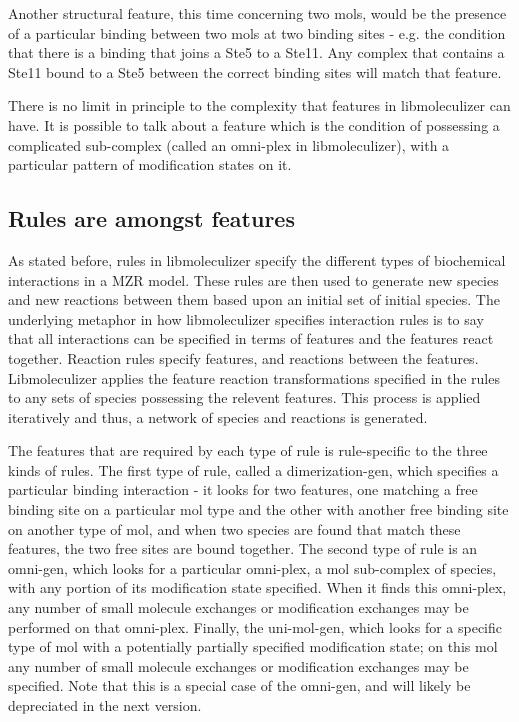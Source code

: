 Another structural feature, this time concerning two mols, would be
the presence of a particular binding between two mols at two binding
sites - e.g. the condition that there is a binding that joins a Ste5
to a Ste11. Any complex that contains a Ste11 bound to a Ste5 between
the correct binding sites will match that feature.

There is no limit in principle to the complexity that features in
libmoleculizer can have. It is possible to talk about a feature which
is the condition of possessing a complicated sub-complex (called an
omni-plex in libmoleculizer), with a particular pattern of
modification states on it.  

\subsection{Rules are amongst features}
As stated before, rules in libmoleculizer specify the different types
of biochemical interactions in a MZR model.  These rules are then used
to generate new species and new reactions between them based upon an
initial set of initial species. The underlying metaphor in how
libmoleculizer specifies interaction rules is to say that all
interactions can be specified in terms of features and the features
react together.  Reaction rules specify features, and reactions
between the features.  Libmoleculizer applies the feature reaction
transformations specified in the rules to any sets of species
possessing the relevent features.  This process is applied
iteratively and thus, a network of species and reactions is generated.  

The features that are required by each type of rule is rule-specific
to the three kinds of rules.  The first type of rule, called a
dimerization-gen, which specifies a particular binding interaction -
it looks for two features, one matching a free binding site on a
particular mol type and the other with another free binding site on
another type of mol, and when two species are found that match these
features, the two free sites are bound together.  The second type of
rule is an omni-gen, which looks for a particular omni-plex, a mol
sub-complex of species, with any portion of its modification state
specified.  When it finds this omni-plex, any number of small molecule
exchanges or modification exchanges may be performed on that
omni-plex.  Finally, the uni-mol-gen, which looks for a specific type
of mol with a potentially partially specified modification state; on
this mol any number of small molecule exchanges or modification
exchanges may be specified.  Note that this is a special case of the
omni-gen, and will likely be depreciated in the next version.

